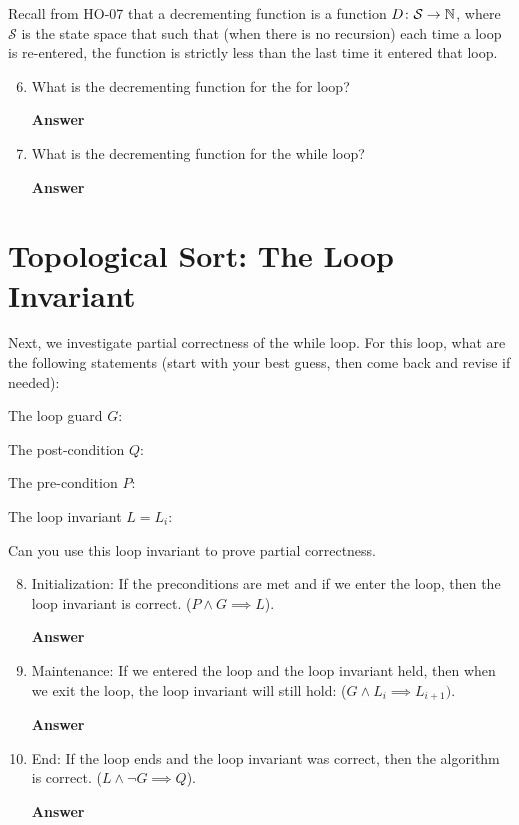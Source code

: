\documentclass{article}
\begin{document}
Recall from HO-07 that a decrementing function is a function $D \colon
\mathcal{S} \to {\mathbb N}$, where $\mathcal{S}$ is the state space that
such that (when there is no recursion) each time a loop is re-entered, the function is strictly less than
the last time it entered that loop.


\begin{enumerate}\setcounter{enumi}{5}
    \item What is the decrementing function for the for loop?

    \textbf{Answer}
    \vspace{1in}

    \item What is the decrementing function for the while loop?

    \textbf{Answer}
    \vspace{1in}
\end{enumerate}

\newpage
\section*{Topological Sort: The Loop Invariant}

Next, we investigate partial correctness of the while loop.  For this loop, what
are the following statements (start with your best guess, then come back and
revise if needed):

The loop guard $G$:
\vspace{1.5in}

The post-condition $Q$:
\vspace{1.5in}

The pre-condition $P$:
\vspace{1.5in}

The loop invariant $L=L_i$:
\vspace{1.5in}

\newpage
Can you use this loop invariant
to prove partial correctness.

\begin{enumerate}\setcounter{enumi}{7}
    \item Initialization: If the preconditions are met and if we enter the loop, then the
    loop invariant is correct. ($P \wedge G \implies L$).

    \textbf{Answer}
    \vspace{2in}


    \item Maintenance: If we entered the loop and the loop invariant held, then when we
    exit the loop, the loop invariant will still hold: ($G \wedge L_i \implies
    L_{i+1})$.

    \textbf{Answer}
    \vspace{2in}


    \item End: If the loop ends and the loop invariant was correct, then the algorithm is
    correct. ($L \wedge \neg G \implies Q$).


    \textbf{Answer}
    \vspace{2in}
\end{enumerate}
\end{document}
